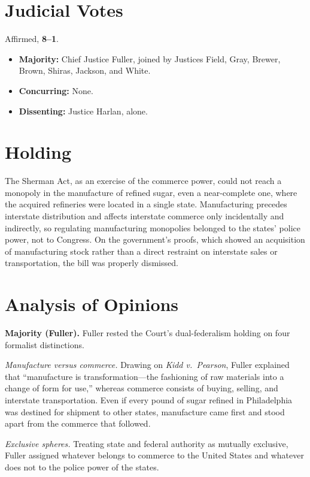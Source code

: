 \documentclass[12pt]{article}
\begin{document}
\section{Judicial Votes}

Affirmed, \textbf{8--1}.
\begin{itemize}
\item \textbf{Majority:} Chief Justice Fuller, joined by Justices Field, Gray, Brewer, Brown, Shiras, Jackson, and White.
\item \textbf{Concurring:} None.
\item \textbf{Dissenting:} Justice Harlan, alone.
\end{itemize}

\section{Holding}

The Sherman Act, as an exercise of the commerce power, could not reach a monopoly in the manufacture of refined sugar, even a near-complete one, where the acquired refineries were located in a single state. Manufacturing precedes interstate distribution and affects interstate commerce only incidentally and indirectly, so regulating manufacturing monopolies belonged to the states' police power, not to Congress. On the government's proofs, which showed an acquisition of manufacturing stock rather than a direct restraint on interstate sales or transportation, the bill was properly dismissed.

\section{Analysis of Opinions}

\textbf{Majority (Fuller).} Fuller rested the Court's dual-federalism holding on four formalist distinctions.

\emph{Manufacture versus commerce.} Drawing on \textit{Kidd v.\ Pearson}, Fuller explained that ``manufacture is transformation---the fashioning of raw materials into a change of form for use,'' whereas commerce consists of buying, selling, and interstate transportation. Even if every pound of sugar refined in Philadelphia was destined for shipment to other states, manufacture came first and stood apart from the commerce that followed.

\emph{Exclusive spheres.} Treating state and federal authority as mutually exclusive, Fuller assigned whatever belongs to commerce to the United States and whatever does not to the police power of the states. 
\end{document}
